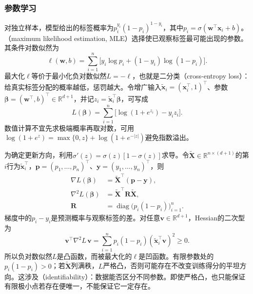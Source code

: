 \subsubsection{参数学习}
\label{sec:classification-logistic-learning}

对独立样本，模型给出的标签概率为$p_i^{y_i}(1-p_i)^{1-y_i}$，其中$p_i=\sigma(\bm{w}^{\top}\bm{x}_i+b)$。（maximum likelihood estimation, MLE）选择使已观察标签最可能出现的参数。其条件对数似然为
\begin{equation}
  \label{eq:classification-logistic-likelihood}
  \ell(\bm{w},b)
  =\sum_{i=1}^{n}
  \bigl[y_i\log p_i+(1-y_i)\log(1-p_i)\bigr].
\end{equation}
最大化$\ell$等价于最小化负对数似然$L=-\ell$，也就是二分类（cross-entropy loss）：给真实标签分配的概率越低，惩罚越大。令增广输入$\tilde{\bm{x}}_i=(\bm{x}_i^{\top},1)^{\top}$、参数$\bm{\beta}=(\bm{w}^{\top},b)^{\top}\in\mathbb{R}^{d+1}$，并记$z_i=\tilde{\bm{x}}_i^{\top}\bm{\beta}$，可写成
\begin{equation}
  \label{eq:classification-logistic-loss}
  L(\bm{\beta})
  =\sum_{i=1}^{n}\bigl[\log(1+e^{z_i})-y_i z_i\bigr].
\end{equation}
数值计算不宜先求极端概率再取对数，可用$\log(1+e^z)=\max\{0,z\}+\log(1+e^{-|z|})$避免指数溢出。

为确定更新方向，利用$\sigma'(z)=\sigma(z)[1-\sigma(z)]$求导。令$\tilde{\bm{X}}\in\mathbb{R}^{n\times(d+1)}$的第$i$行为$\tilde{\bm{x}}_i^{\top}$，$\bm{p}=(p_1,\ldots,p_n)^{\top}$、$\bm{y}=(y_1,\ldots,y_n)^{\top}$，则
\begin{equation}
  \label{eq:classification-logistic-derivatives}
  \begin{aligned}
    \nabla L(\bm{\beta})
      &=\tilde{\bm{X}}^{\top}(\bm{p}-\bm{y}),\\
    \nabla^2 L(\bm{\beta})
      &=\tilde{\bm{X}}^{\top}\bm{R}\tilde{\bm{X}},\\
    \bm{R}
      &=\operatorname{diag}\bigl(p_i(1-p_i)\bigr)_{i=1}^{n}.
  \end{aligned}
\end{equation}
梯度中的$p_i-y_i$是预测概率与观察标签的差。对任意$\bm{v}\in\mathbb{R}^{d+1}$，Hessian的二次型为
\[
  \bm{v}^{\top}\nabla^2L\,\bm{v}
  =\sum_{i=1}^{n}p_i(1-p_i)
    (\tilde{\bm{x}}_i^{\top}\bm{v})^2\geq0.
\]
所以负对数似然$L$是凸函数，而被最大化的$\ell$是凹函数。有限参数处的$p_i(1-p_i)>0$；若$\tilde{\bm{X}}$列满秩，$L$严格凸，否则可能存在不改变训练得分的平坦方向。这涉及（identifiability）：数据能否区分不同参数。即使严格凸，也只能保证有限极小点若存在便唯一，不能保证它一定存在。

